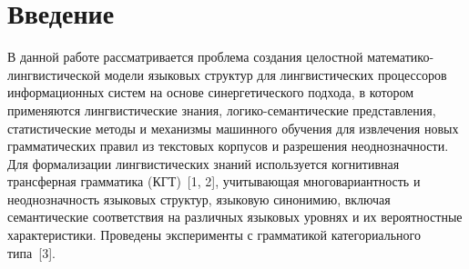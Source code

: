 \vspace*{-6pt}
      


\vspace*{-3pt}


      \thispagestyle{headings}

      \begin{multicols}{2}

            \label{st\stat}
    
    \section{Введение}
     
  В данной работе рассматривается проблема создания целостной 
  ма\-те\-ма\-ти\-ко-линг\-ви\-сти\-че\-ской модели языковых структур для 
лингвистических процессоров информационных систем на основе 
синергетического подхода, в котором применяются лингвистические знания, 
логико-семантические представления, статистические методы и механизмы 
машинного обучения для извлечения новых грамматических правил из 
текстовых корпусов и разрешения неоднозначности. Для формализации 
лингвистических знаний используется когнитивная трансферная грамматика 
(КГТ)~[1, 2], учитывающая многовариантность и неоднозначность языковых 
структур, языковую синонимию, включая семантические соответствия на 
различных языковых уровнях и их вероятностные характеристики. 
Проведены эксперименты с грамматикой категориального типа~[3]. 


\end{multicols}
